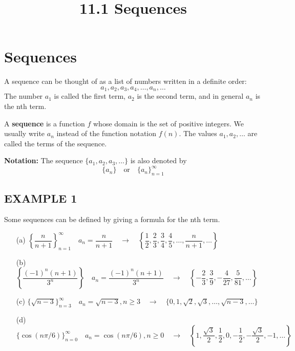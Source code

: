 \documentclass{article}
\title{11.1 Sequences}
\date{}
\author{}
\theoremstyle{mystyle}
\begin{document}
\maketitle

\section*{Sequences}
A sequence can be thought of as a list of numbers written in a definite order:
\[ a_1, a_2, a_3, a_4, \dots, a_n, \dots \]
The number \(a_1\) is called the first term, \(a_2\) is the second term, and in general \(a_n\) is the nth term.

\begin{tcolorbox}[colback=white, colframe=orange!80!white, title=Definition of a Sequence, boxrule=0.5mm, arc=3mm]
A \textbf{sequence} is a function \(f\) whose domain is the set of positive integers. We usually write \(a_n\) instead of the function notation \(f(n)\). The values \(a_1, a_2, \dots\) are called the terms of the sequence.
\end{tcolorbox}

\noindent
\textbf{Notation:} The sequence $\{a_1, a_2, a_3, \dots\}$ is also denoted by
\[ \{a_n\} \quad \text{or} \quad \{a_n\}_{n=1}^{\infty} \]

\subsection*{EXAMPLE 1}
Some sequences can be defined by giving a formula for the nth term.
\begin{itemize}
    \item[(a)] \( \left\{\dfrac{n}{n+1}\right\}_{n=1}^\infty \quad a_n = \dfrac{n}{n+1} \quad \rightarrow \quad \left\{\dfrac{1}{2}, \dfrac{2}{3}, \dfrac{3}{4}, \dfrac{4}{5}, \dots, \dfrac{n}{n+1}, \dots \right\} \)
    \item[(b)] \( \left\{\dfrac{(-1)^n (n+1)}{3^n}\right\} \quad a_n = \dfrac{(-1)^n (n+1)}{3^n} \quad \rightarrow \quad \left\{-\dfrac{2}{3}, \dfrac{3}{9}, -\dfrac{4}{27}, \dfrac{5}{81}, \dots \right\} \)
    \item[(c)] \( \{\sqrt{n-3}\}_{n=3}^\infty \quad a_n = \sqrt{n-3}, n \ge 3 \quad \rightarrow \quad \{0, 1, \sqrt{2}, \sqrt{3}, \dots, \sqrt{n-3}, \dots\} \)
    \item[(d)] \( \{\cos(n\pi/6)\}_{n=0}^\infty \quad a_n = \cos(n\pi/6), n \ge 0 \quad \rightarrow \quad \left\{1, \dfrac{\sqrt{3}}{2}, \dfrac{1}{2}, 0, -\dfrac{1}{2}, -\dfrac{\sqrt{3}}{2}, -1, \dots \right\} \)
\end{itemize}
\end{document}
